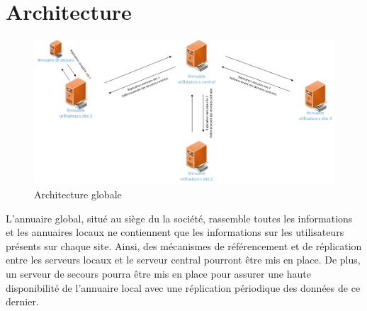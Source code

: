 \documentclass[11pt,fleqn]{report}
\begin{document}
\chapter{Architecture}
\begin{figure}[htbp]
	\centering
	\includegraphics[scale=0.6]{Images/SchemaGlobal.png}
	\caption{Architecture globale}
	\label{SchemaGlobal}
\end{figure}
L’annuaire global, situé au siège du la société, rassemble toutes les informations et les annuaires locaux ne contiennent que les informations sur les utilisateurs présents sur chaque site. Ainsi, des mécanismes de référencement et de réplication entre les serveurs locaux et le serveur central pourront être mis en place.
De plus, un serveur de secours pourra être mis en place pour assurer une haute disponibilité de l’annuaire local avec une réplication périodique des données de ce dernier.
\end{document}
